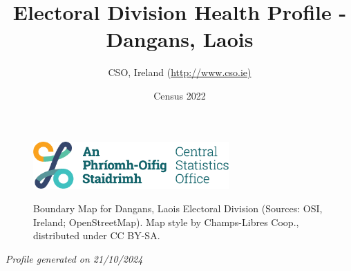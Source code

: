 \documentclass{article}
\title{Electoral Division Health Profile - Dangans, Laois}
\date{Census 2022}
\author{CSO, Ireland  (\url{http://www.cso.ie)}}
\begin{document}


\begin{figure}
	\centering
\includegraphics[width =75mm]{../figures/CSO_Logo.png}
\end{figure}

\begin{figure}[h]
	\centering
	\setlength{\fboxsep}{1pt}
	\caption{\normalsize Boundary Map for Dangans, Laois Electoral Division (Sources: OSI, Ireland; OpenStreetMap). Map style by Champs-Libres Coop., distributed under CC BY-SA.}
	\label{fig:2ae19629-1a6a-13a3-e055-000000000001}
	\end{figure}
	{\let\newpage\relax\maketitle}
	     \begin{center}
         \emph{Profile generated on 21/10/2024}
     \end{center}
\end{document}
